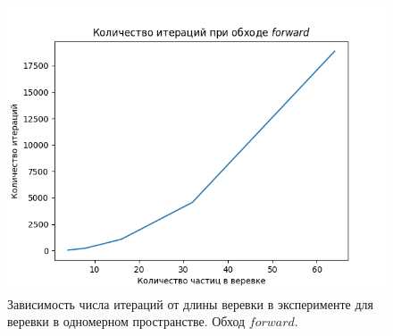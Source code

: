 	\begin{figure}[ht!] 
		\center
		\includegraphics [scale=0.58] {my_folder/images//iter-plot}
		\caption{Зависимость числа итераций от длины веревки в эксперименте для веревки в одномерном пространстве. Обход $forward$.}
		\label{fig:amount-experiment}  
	\end{figure}
	
